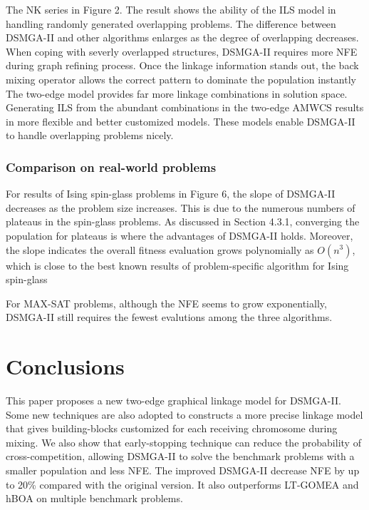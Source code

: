 \documentclass{sig-alternate-05-2015}
\begin{document}
The NK series in Figure 2.
The result shows the ability of the ILS model in handling randomly generated overlapping problems. 
The difference between DSMGA-II and other algorithms enlarges as the degree of overlapping decreases. 
When coping with severly overlapped structures, DSMGA-II requires more NFE during graph refining process.
Once the linkage information stands out, the back mixing operator allows the correct pattern to dominate the population instantly 
The two-edge model provides far more linkage combinations in solution space.
Generating ILS from the abundant combinations in the two-edge AMWCS results in more flexible and better customized models.
These models enable DSMGA-II to handle overlapping problems nicely. 


\subsubsection{ Comparison on real-world problems }



For results of Ising spin-glass problems in Figure 6, the slope of DSMGA-II decreases as the problem size increases. 
This is due to the numerous numbers of plateaus in the spin-glass problems.
As discussed in Section 4.3.1, converging the population for plateaus is where the advantages of DSMGA-II holds.
Moreover, the slope indicates the overall fitness evaluation grows polynomially as $O(n^3)$, which is close to the best known results of problem-specific algorithm for Ising spin-glass~\cite{galluccio:pfaffian}

For MAX-SAT problems, although the NFE seems to grow exponentially, DSMGA-II still requires the fewest evalutions among the three algorithms.



\section{Conclusions}
This paper proposes a new two-edge graphical linkage model for DSMGA-II. 
Some new techniques are also adopted to constructs a more precise linkage model that gives building-blocks customized for each receiving chromosome during mixing.
We also show that early-stopping technique can reduce the probability of cross-competition, allowing DSMGA-II to solve the benchmark problems with a smaller population and less NFE.
The improved DSMGA-II decrease NFE by up to 20\% compared with the original version. It also outperforms LT-GOMEA and hBOA on multiple benchmark problems. 
\end{document}
